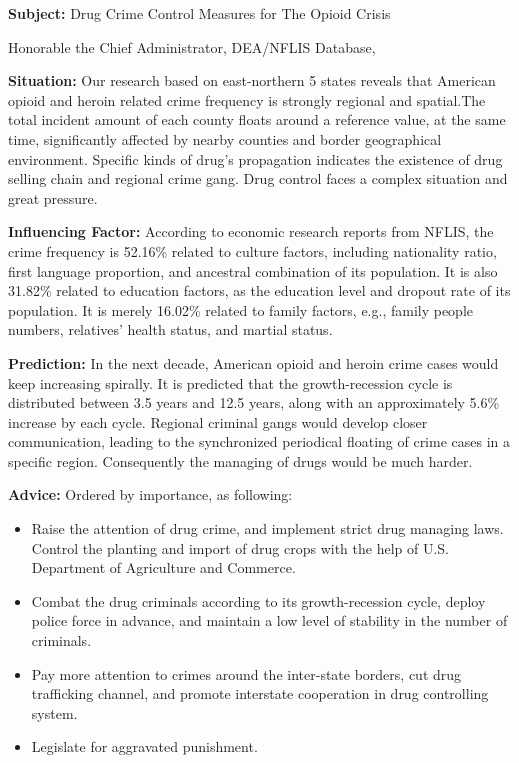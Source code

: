 \documentclass{mcmthesis}
\begin{document}
\textbf{Subject:} Drug Crime Control Measures for The Opioid Crisis

Honorable the Chief Administrator, DEA/NFLIS Database,

\textbf{Situation:} Our research based on east-northern 5 states reveals that American opioid and heroin related crime frequency is strongly regional and spatial.The total incident amount of each county floats around a reference value, at the same time, significantly affected by nearby counties and border geographical environment. Specific kinds of drug's propagation indicates the existence of drug selling chain and regional crime gang. Drug control faces a complex situation and great pressure.

\textbf{Influencing Factor:} According to economic research reports from NFLIS, the crime frequency is 52.16\% related to culture factors, including nationality ratio, first language proportion, and ancestral combination of its population. It is also 31.82\% related to education factors, as the education level and dropout rate of its population. It is merely 16.02\% related to family factors, e.g., family people numbers, relatives' health status, and martial status.

\textbf{Prediction:} In the next decade, American opioid and heroin crime cases would keep increasing spirally. It is predicted that the growth-recession cycle is distributed between 3.5 years and 12.5 years, along with an approximately 5.6\% increase by each cycle. Regional criminal gangs would develop closer communication, leading to the synchronized periodical floating of crime cases in a specific region. Consequently the managing of drugs would be much harder.

\textbf{Advice:} Ordered by importance, as following:
\begin{itemize}
	\item Raise the attention of drug crime, and implement strict drug managing laws. Control the planting and import of drug crops with the help of U.S. Department of Agriculture and Commerce.
	\item Combat the drug criminals according to its growth-recession cycle, deploy police force in advance, and maintain a low level of stability in the number of criminals.
	\item Pay more attention to crimes around the inter-state borders, cut drug trafficking channel, and promote interstate cooperation in drug controlling system.
	\item Legislate for aggravated punishment.
\end{itemize}
\end{document}
